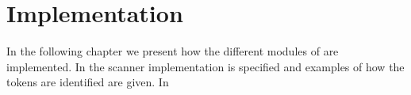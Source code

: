 \chapter{Implementation}
\label{chap:implementation}

In the following chapter we present how the different modules of \productname{} are implemented. In  the scanner implementation is specified and examples of how the tokens are identified are given. In   










